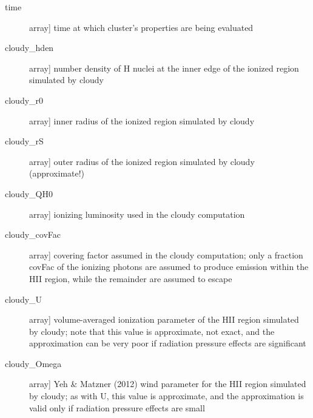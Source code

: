 \documentclass[letterpaper,10pt,english]{sphinxmanual}
\begin{document}
\begin{fulllineitems}
\begin{description}
\begin{description}
\item[{time}] \leavevmode{[}array{]}
time at which cluster's properties are being evaluated

\item[{cloudy\_hden}] \leavevmode{[}array{]}
number density of H nuclei at the inner edge of the ionized
region simulated by cloudy

\item[{cloudy\_r0}] \leavevmode{[}array{]}
inner radius of the ionized region simulated by cloudy

\item[{cloudy\_rS}] \leavevmode{[}array{]}
outer radius of the ionized region simulated by cloudy (approximate!)

\item[{cloudy\_QH0}] \leavevmode{[}array{]}
ionizing luminosity used in the cloudy computation

\item[{cloudy\_covFac}] \leavevmode{[}array{]}
covering factor assumed in the cloudy computation; only a
fraction covFac of the ionizing photons are assumed to
produce emission within the HII region, while the remainder
are assumed to escape

\item[{cloudy\_U}] \leavevmode{[}array{]}
volume-averaged ionization parameter of the HII region
simulated by cloudy; note that this value is approximate,
not exact, and the approximation can be very poor if
radiation pressure effects are significant

\item[{cloudy\_Omega}] \leavevmode{[}array{]}
Yeh \& Matzner (2012) wind parameter for the HII region
simulated by cloudy; as with U, this value is approximate,
and the approximation is valid only if radiation pressure
effects are small

\end{description}

\end{description}

\end{fulllineitems}

\end{document}
